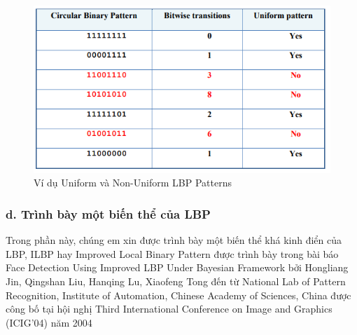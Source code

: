 \documentclass{article}
\begin{document}
	\begin{figure}[H]
		\centering
		\includegraphics[width=0.75\linewidth]{images/example_uniform_non_uniform.png}
		\caption{Ví dụ Uniform và Non-Uniform LBP Patterns}
		\label{fig:writing-thesis}
	\end{figure}

	\subsubsection{d. Trình bày một biến thể của LBP}
	\qquad Trong phần này, chúng em xin được trình bày một biến thể khá kinh điển của LBP, ILBP hay Improved Local Binary Pattern được trình bày trong bài báo Face Detection Using Improved LBP Under Bayesian Framework bởi Hongliang Jin, Qingshan Liu, Hanqing Lu, Xiaofeng Tong đến từ National Lab of Pattern Recognition, Institute of Automation, Chinese Academy of Sciences, China được công bố tại hội nghị Third International Conference on Image and Graphics (ICIG'04) năm 2004
	
\end{document}
